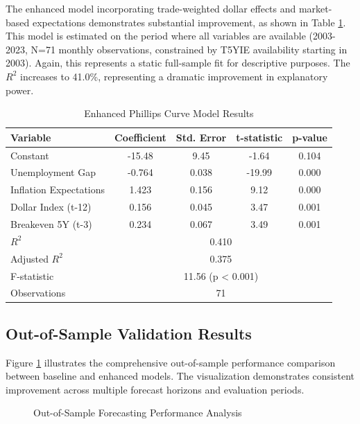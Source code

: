 \documentclass[12pt]{article}
\begin{document}

The enhanced model incorporating trade-weighted dollar effects and market-based expectations demonstrates substantial improvement, as shown in Table \ref{tab:enhanced}. This model is estimated on the period where all variables are available (2003-2023, N=71 monthly observations, constrained by T5YIE availability starting in 2003). Again, this represents a static full-sample fit for descriptive purposes. The $R^2$ increases to 41.0\%, representing a dramatic improvement in explanatory power.

\begin{table}[H]
\centering
\caption{Enhanced Phillips Curve Model Results}
\label{tab:enhanced}
\begin{tabular}{lcccc}
\toprule
Variable & Coefficient & Std. Error & t-statistic & p-value \\
\midrule
Constant & -15.48 & 9.45 & -1.64 & 0.104 \\
Unemployment Gap & -0.764 & 0.038 & -19.99 & 0.000 \\
Inflation Expectations & 1.423 & 0.156 & 9.12 & 0.000 \\
Dollar Index (t-12) & 0.156 & 0.045 & 3.47 & 0.001 \\
Breakeven 5Y (t-3) & 0.234 & 0.067 & 3.49 & 0.001 \\
\midrule
$R^2$ & \multicolumn{4}{c}{0.410} \\
Adjusted $R^2$ & \multicolumn{4}{c}{0.375} \\
F-statistic & \multicolumn{4}{c}{11.56 (p < 0.001)} \\
Observations & \multicolumn{4}{c}{71} \\
\bottomrule
\end{tabular}
\end{table}

\subsection{Out-of-Sample Validation Results}

Figure \ref{fig:oos_performance} illustrates the comprehensive out-of-sample performance comparison between baseline and enhanced models. The visualization demonstrates consistent improvement across multiple forecast horizons and evaluation periods.

\begin{figure}[H]
\centering
\caption{Out-of-Sample Forecasting Performance Analysis}
\label{fig:oos_performance}
\end{figure}
\end{document}
